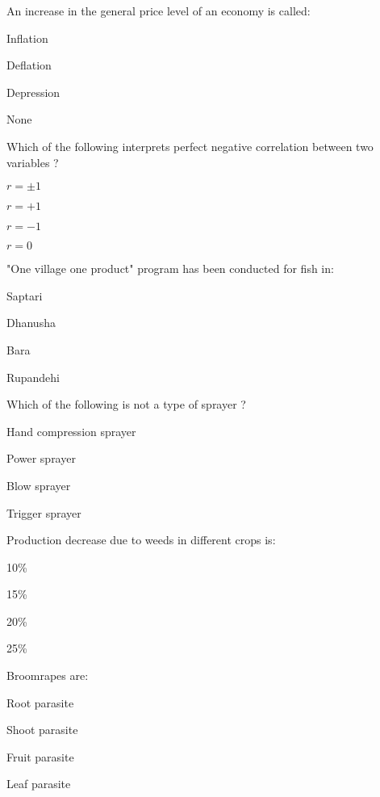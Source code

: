 \begin{questions}
\question An increase in the general price level of an economy is called:
  \begin{items}
  \item Inflation
  \item Deflation
  \item Depression
  \item None
  \end{items}

\question Which of the following interprets perfect negative correlation between two variables ?
  \begin{items}
  \item $r = \pm 1$
  \item $r = + 1$
  \item $r = - 1$
  \item $r = 0$
  \end{items}

\question "One village one product" program has been conducted for fish in:
  \begin{items}
  \item Saptari
  \item Dhanusha
  \item Bara
  \item Rupandehi
  \end{items}

\question Which of the following is not a type of sprayer ?
  \begin{items}
  \item Hand compression sprayer
  \item Power sprayer
  \item Blow sprayer
  \item Trigger sprayer
  \end{items}

\question Production decrease due to weeds in different crops is:
  \begin{items}
  \item 10\%
  \item 15\%
  \item 20\%
  \item 25\%
  \end{items}

\question Broomrapes are:
  \begin{items}
  \item Root parasite
  \item Shoot parasite
  \item Fruit parasite
  \item Leaf parasite
  \end{items}


\end{questions}
